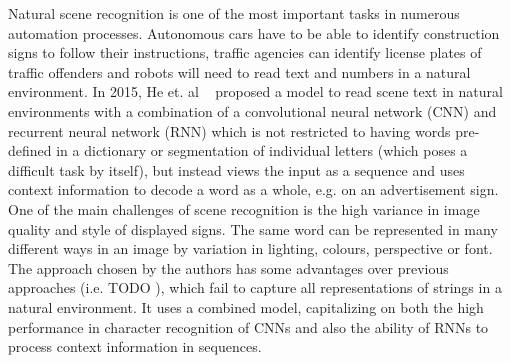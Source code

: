 \documentclass{utue} %
\begin{document}
Natural scene recognition is one of the most important tasks in numerous automation processes. Autonomous cars have to be able to identify construction signs to follow their instructions, traffic agencies can identify license plates of traffic offenders %
and robots will need to read text and numbers in a natural environment. In 2015, He et. al ~\cite{2015arXiv150604395H} proposed a model to read scene text in natural environments with a combination of a convolutional neural network (CNN) and recurrent neural network (RNN) which is not restricted to having words pre-defined in a dictionary or segmentation of individual letters (which poses a difficult task by itself), but instead views the input as a sequence and uses context information to decode a word as a whole, e.g. on an advertisement sign. One of the main challenges of scene recognition is the high variance in image quality and style of displayed signs. The same word can be represented in many different ways in an image by variation in lighting, colours, perspective or font. The approach chosen by the authors has some advantages over previous approaches (i.e. TODO %
), which fail to capture all representations of strings in a natural environment. It uses a combined model, capitalizing on both the high performance in character recognition of CNNs and also the ability of RNNs to process context information in sequences. \\
\end{document}
